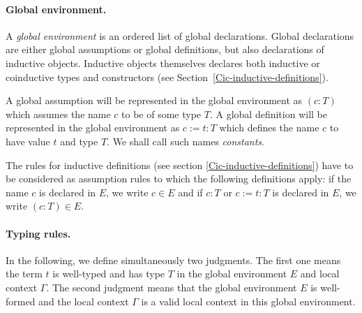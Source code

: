 \paragraph[Global environment.]{Global environment.}

A {\em global environment} is an ordered list of global declarations.
Global declarations are either global assumptions or global
definitions, but also declarations of inductive objects. Inductive objects themselves declares both inductive or coinductive types and constructors
(see Section~\ref{Cic-inductive-definitions}).

A global assumption will be represented in the global environment as
$(c:T)$ which assumes the name $c$ to be of some type $T$.
A global definition will
be represented in the global environment as $c:=t:T$ which defines
the name $c$ to have value $t$ and type $T$.
We shall call such names {\em constants}.

The rules for inductive definitions (see section
\ref{Cic-inductive-definitions}) have to be considered as assumption
rules to which the following definitions apply: if the name $c$ is
declared in $E$, we write $c \in E$ and if $c:T$ or $c:=t:T$ is
declared in $E$, we write $(c : T) \in E$.

\paragraph[Typing rules.]{Typing rules.\label{Typing-rules}}
In the following, we define simultaneously two
judgments.  The first one  means the term $t$ is well-typed
and has type $T$ in the global environment $E$ and local context $\Gamma$.  The
second judgment \WFE{\Gamma} means that the global environment $E$ is
well-formed and the local context $\Gamma$ is a valid local context in this
global environment.
%

